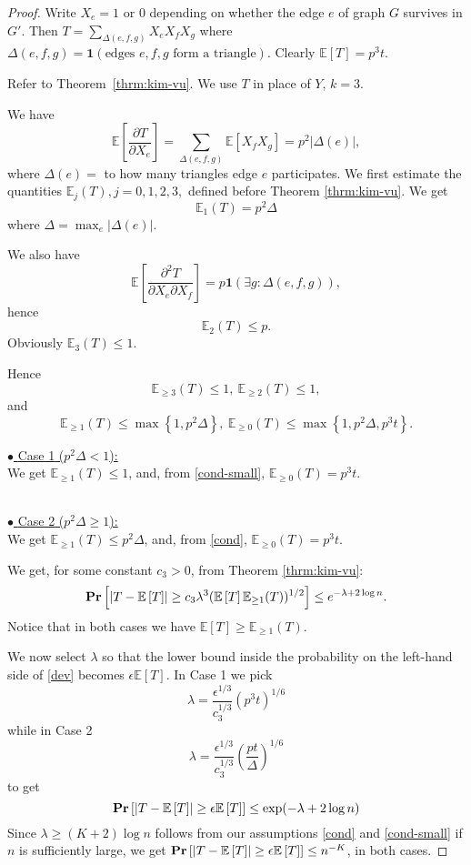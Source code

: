 \documentclass{llncs}
\newcommand{\beql}[1]{\begin{equation}\label{#1}}
\newcommand{\eeq}{\end{equation}}
\newcommand{\Abs}[1]{{\left|{#1}\right|}}
\newcommand{\Mean}[1]{{\mathbb E}\left[{#1}\right]}
\newcommand{\Prob}[1]{{{\bf{Pr}}\left[{#1}\right]}}
\newcommand{\Set}[1]{{\left\{{#1}\right\}}}
\newcommand{\One}[1]{{\mathbf 1}\left(#1\right)}
\begin{document}
\begin{proof}
Write $X_e=1$ or $0$ depending on whether the edge $e$ of graph $G$ survives in $G'$. Then
$T = \sum_{\Delta(e,f,g)} X_e X_f X_g$ where
$\Delta(e,f,g) = \One{\mbox{edges $e,f,g$ form a triangle}}$.
Clearly $\Mean{T} = p^3 t$.

Refer to Theorem~\ref{thrm:kim-vu}. We use $T$ in place of $Y$, $k=3$.

We have
$$
\Mean{\frac{\partial T}{\partial X_e}} = \sum_{\Delta(e,f,g)} \Mean{X_f X_g} = p^2 \Abs{\Delta(e)},
$$
where $\Delta(e) = $ to how many triangles edge $e$ participates.
We first estimate the quantities ${\mathbb E}_j (T), j=0,1,2,3,$ defined before Theorem \ref{thrm:kim-vu}.
We get \beql{e1}
{\mathbb E}_1 (T) = p^2 \Delta
\eeq
where $\Delta = \max_{e} \Abs{\Delta(e)}$.

We also have
$$
\Mean{\frac{\partial^2 T}{\partial X_e \partial X_f}} = p\One{\exists g: \Delta(e,f,g)},
$$
hence
\beql{e2}
{\mathbb E}_2 (T) \le p.
\eeq
Obviously ${\mathbb E}_3(T) \le 1$.

Hence
$$
{\mathbb E}_{\ge 3} (T) \le 1,\ 
{\mathbb E}_{\ge 2} (T) \le 1,
$$
and
$$
{\mathbb E}_{\ge 1} (T) \le \max\Set{1, p^2\Delta},\ 
{\mathbb E}_{\ge 0} (T) \le \max\Set{1, p^2\Delta, p^3t}.
$$

\noindent
\underline{$\bullet$ {\sc Case 1} ($p^2\Delta < 1$):}\\
We get ${\mathbb E}_{\ge 1} (T) \le 1$, and, from \eqref{cond-small}, ${\mathbb E}_{\ge 0} (T) = p^3t$. 

\noindent \\
\underline{$\bullet$ {\sc Case 2} ($p^2\Delta \ge 1$):}\\
We get ${\mathbb E}_{\ge 1} (T) \le p^2\Delta$, and, from \eqref{cond}, ${\mathbb E}_{\ge 0} (T) = p^3t$.

We get, for some constant $c_3>0$, from Theorem \ref{thrm:kim-vu}:
\beql{dev}
\Prob{\Abs{T-\Mean{T}} \ge c_3 \lambda^3 (\Mean{T} {\mathbb E}_{\ge 1}(T))^{1/2}} \le e^{-\lambda + 2\log n}.
\eeq
Notice that in both cases we have $\Mean{T} \ge {\mathbb E}_{\ge 1}(T)$.

We now select $\lambda$ so that the lower bound inside the probability on the left-hand side of \eqref{dev} becomes $\epsilon\Mean{T}$.
In Case 1 we pick
$$
\lambda = \frac{\epsilon^{1/3}}{c_3^{1/3}} (p^3 t)^{1/6}
$$
while in Case 2
$$
\lambda = \frac{\epsilon^{1/3}}{c_3^{1/3}} \left(\frac{pt}{\Delta}\right)^{1/6}
$$
to get
\beql{dev1}
\Prob{\Abs{T-\Mean{T}} \ge \epsilon \Mean{T}} \le \exp(-\lambda+2\log n) 
\eeq
Since $\lambda \ge (K+2) \log n$ follows from our assumptions \eqref{cond} and \eqref{cond-small} if $n$ is sufficiently large, we get
$\Prob{\Abs{T-\Mean{T}} \ge \epsilon \Mean{T}} \le n^{-K}$, in both cases. 
\end{proof}
\end{document}
